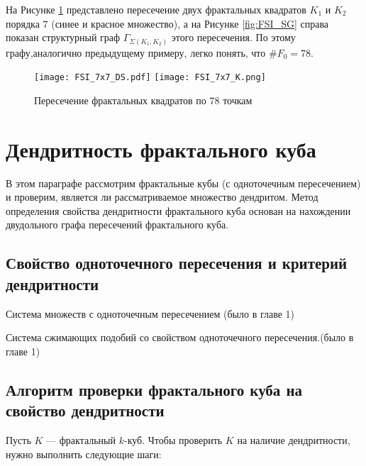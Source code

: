 \begin{example}
\label{ex:FSI_6x6}
На Рисунке \ref{fig:FSI_7x7} представлено пересечение двух фрактальных квадратов $K_1$ и $K_2$ порядка $7$ (синее и красное множество), а на Рисунке \ref{fig:FSI_SG} справа показан структурный граф $\Gamma_{\Sigma(K_1,K_2)}$ этого пересечения.
По этому графу,аналогично предыдущему примеру, легко понять, что $\#F_0=78.$

\end{example}

\begin{figure}[H]
    \centering
    \hfill
    \texttt{[image: FSI\_7x7\_DS.pdf]}
    \hfill
    \texttt{[image: FSI\_7x7\_K.png]}
    \hfill
    \caption{Пересечение фрактальных квадратов по 78 точкам}
    \label{fig:FSI_7x7}
\end{figure}


\section{Дендритность фрактального куба}

В этом параграфе рассмотрим фрактальные кубы (с одноточечным пересечением) и проверим, является ли рассматриваемое множество дендритом.
Метод определения свойства дендритности фрактального куба основан на нахождении двудольного графа пересечений фрактального куба.

\subsection{Свойство одноточечного пересечения и критерий дендритности}

\begin{definition}\label{fipss}\cite{FIP}
Система множеств с одноточечным пересечением (было в главе 1)  
\end{definition}

\begin{definition}\label{fipcs}
Система сжимающих подобий со свойством одноточечного пересечения.(было в главе 1)
\end{definition}

\subsection{Алгоритм проверки фрактального куба на свойство дендритности}

Пусть $K$ --- фрактальный $k$-куб.
Чтобы проверить $K$ на наличие дендритности, нужно выполнить следующие шаги:

